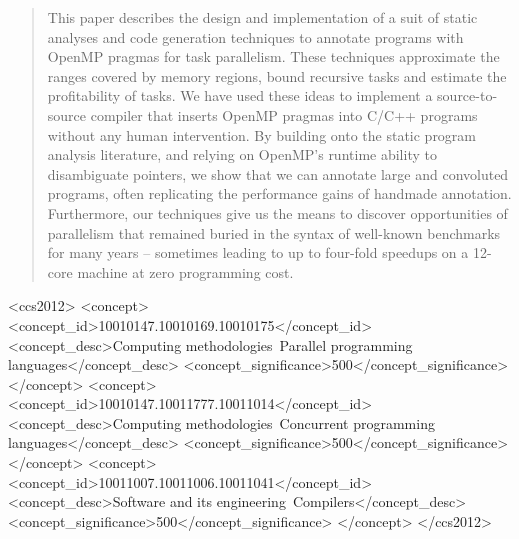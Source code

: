 \documentclass[sigplan,10pt,screen]{acmart}
\begin{document}
\begin{abstract}
This paper describes the design and implementation of a suit of static analyses
and code generation techniques to annotate programs with OpenMP pragmas for
task parallelism.
These techniques approximate the ranges covered by memory regions, bound
recursive tasks and estimate the profitability of tasks.
We have used these ideas to implement a source-to-source compiler that inserts 
OpenMP pragmas into C/C++ programs without any human intervention.
By building onto the static program analysis literature, and relying on OpenMP's
runtime ability to disambiguate pointers, we show that we can annotate large and
convoluted programs, often replicating the performance gains of handmade
annotation.
Furthermore, our techniques give us the means to discover opportunities of
parallelism that remained buried in the syntax  of well-known benchmarks for many
years -- sometimes leading to up to four-fold speedups on a 12-core machine at
zero programming cost.
\end{abstract}

 \begin{CCSXML}
<ccs2012>
<concept>
<concept_id>10010147.10010169.10010175</concept_id>
<concept_desc>Computing methodologies~Parallel programming languages</concept_desc>
<concept_significance>500</concept_significance>
</concept>
<concept>
<concept_id>10010147.10011777.10011014</concept_id>
<concept_desc>Computing methodologies~Concurrent programming languages</concept_desc>
<concept_significance>500</concept_significance>
</concept>
<concept>
<concept_id>10011007.10011006.10011041</concept_id>
<concept_desc>Software and its engineering~Compilers</concept_desc>
<concept_significance>500</concept_significance>
</concept>
</ccs2012>
\end{CCSXML}



\maketitle
\renewcommand{\shortauthors}{Ramos, P., Souza, G., Soares, D., Ara\'{u}jo, G., Quint\~{a}o, F.}
\end{document}
